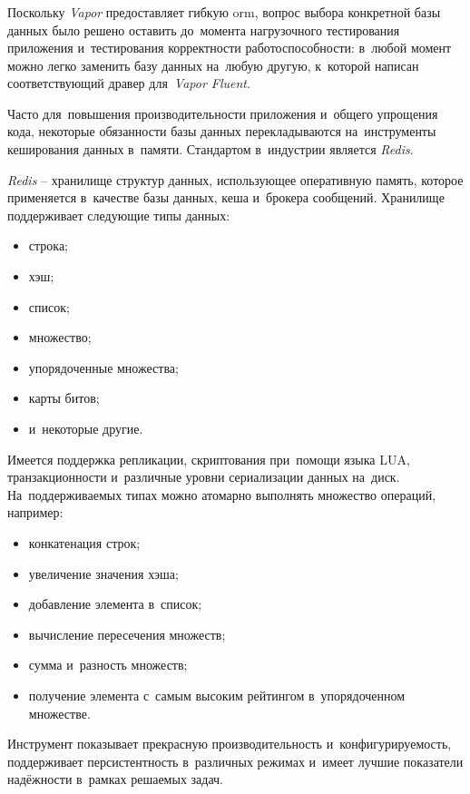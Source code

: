 \subsubsection{}
\label{sec:development:arch:pp:redis}

Поскольку \textit{Vapor} предоставляет гибкую \gls{orm}, вопрос выбора конкретной базы данных было решено оставить до~момента нагрузочного тестирования приложения и~тестирования корректности работоспособности: в~любой момент можно легко заменить базу данных на~любую другую, к~которой написан соответствующий дравер для~\textit{Vapor Fluent}.

Часто для~повышения производительности приложения и~общего упрощения кода, некоторые обязанности базы данных перекладываются на~инструменты кеширования данных в~памяти. Стандартом в~индустрии является \textit{Redis}.

\textit{Redis} -- хранилище структур данных, использующее оперативную память, которое применяется в~качестве базы данных, кеша и~брокера сообщений. Хранилище поддерживает следующие типы данных:

\begin{itemize}
	\item строка;
	\item хэш;
	\item список;
	\item множество;
	\item упорядоченные множества;
	\item карты битов;
	\item и~некоторые другие.
\end{itemize}

Имеется поддержка репликации, скриптования при~помощи языка LUA, транзакционности и~различные уровни сериализации данных на~диск. На~поддерживаемых типах можно атомарно выполнять множество операций, например:

\begin{itemize}
	\item конкатенация строк;
	\item увеличение значения хэша;
	\item добавление элемента в~список;
	\item вычисление пересечения множеств;
	\item сумма и~разность множеств;
	\item получение элемента с~самым высоким рейтингом в~упорядоченном множестве.
\end{itemize}

Инструмент показывает прекрасную производительность и~конфигурируемость, поддерживает персистентность в~различных режимах и~имеет лучшие показатели надёжности в~рамках решаемых задач.